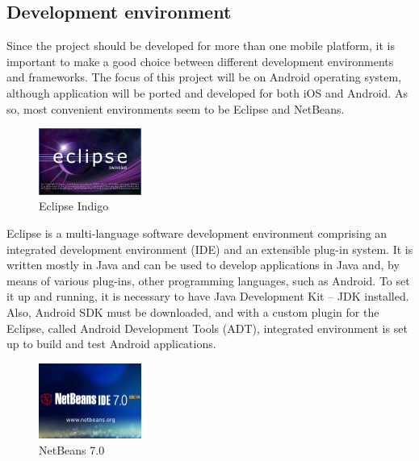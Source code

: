 \pagebreak
\subsection{Development environment}

Since the project should be developed for more than one mobile platform, it is important to make a good choice between different development environments and frameworks. The focus of this project will be on Android operating system, although application will be ported and developed for both iOS and Android.
As so, most convenient environments seem to be Eclipse and NetBeans.\newline

\begin{figure}[htb]
	\centering
	\includegraphics[width=0.3\textwidth]{prestudy/development_environment/Eclipse.png}
	\caption{Eclipse Indigo}
	\label{fig:Eclipse Indigo}
\end{figure}
	
Eclipse is a multi-language software development environment comprising an integrated development environment (IDE) and an extensible plug-in system. It is written mostly in Java and can be used to develop applications in Java and, by means of various plug-ins, other programming languages, such as Android. 
To set it up and running, it is necessary to have Java Development Kit – JDK installed. Also, Android SDK must be downloaded, and with a custom plugin for the Eclipse, called Android Development Tools (ADT), integrated environment is set up to build and test Android applications.\newline

\begin{figure}[htb]
	\centering
	\includegraphics[width=0.3\textwidth]{prestudy/development_environment/netBeans.png}
	\caption{NetBeans 7.0}
	\label{fig:NetBeans}
\end{figure}

